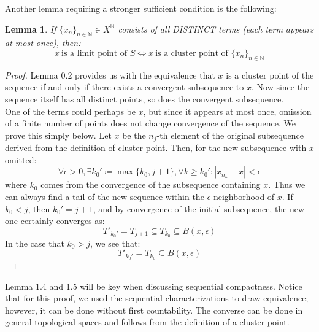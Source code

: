 \documentclass[10pt,letterpaper]{article} %
\newtheorem{lem}{Lemma}[section]
\begin{document}
Another lemma requiring a stronger sufficient condition is the following:
\begin{lem}
If $\{x_n\}_{n \in \mathbb{N}} \in X^\mathbb{N}$ consists of all DISTINCT terms (each term appears at most once), then:
\begin{equation*}
x \ \text{is a limit point of } S \iff x \ \text{is a cluster point of } \{x_n\}_{n \in \mathbb{N}}  
\end{equation*} 
\end{lem}
\begin{proof}
Lemma 0.2 provides us with the equivalence that $x$ is a cluster point of the sequence if and only if there exists a convergent subsequence to $x$. Now since the sequence itself has all distinct points, so does the convergent subsequence.\\

One of the terms could perhaps be $x$, but since it appears at most once, omission of a finite number of points does not change convergence of the sequence. We prove this simply below. Let $x$ be the $n_j$-th element of the original subsequence derived from the definition of cluster point. Then, for the new subsequence with $x$ omitted:
\begin{equation*}
\forall \epsilon > 0, \exists k_0' \coloneq \max\{k_0, j+1\}, \forall k \geqslant k_0': |x_{n_k} - x| < \epsilon
\end{equation*}
where $k_0$ comes from the convergence of the subsequence containing $x$. Thus we can always find a tail of the new sequence within the $\epsilon$-neighborhood of $x$. If $k_0 < j$, then $k_0' = j+1$, and by convergence of the initial subsequence, the new one certainly converges as:
\begin{equation*}
T'_{k_0'} = T_{j+1} \subseteq T_{k_0} \subseteq B(x, \epsilon)
\end{equation*}
In the case that $k_0 > j$, we see that:
\begin{equation*}
T'_{k_0'} = T_{k_0} \subseteq B(x, \epsilon)
\end{equation*}
\end{proof}
Lemma 1.4 and 1.5 will be key when discussing sequential compactness. Notice that for this proof, we used the sequential characterizations to draw equivalence; however, it can be done without first countability. The converse can be done in general topological spaces and follows from the definition of a cluster point.\\
\end{document}
